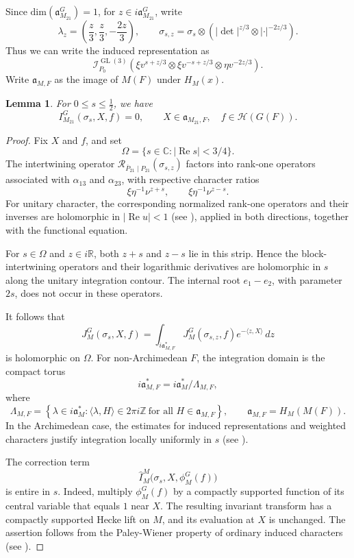\documentclass[11pt]{amsart}
\newtheorem {lemma}      [theorem]    {Lemma}
\renewcommand{\rm}{\mathrm}
\theoremstyle{definition}
\numberwithin{equation}{section}
\begin{document}
	
	Since \(\rm{dim}(\mathfrak{a}_{M_{21}}^G)=1\), for \(z\in i\mathfrak{a}_{M_{21}}^G\), write \[\lambda_z=
\left(\frac z3,\frac z3,-\frac{2z}3\right),\qquad
	\sigma_{s,z} = \sigma_s \otimes \left( | \det |^{z/3} \otimes | \cdot |^{-2z/3} \right).
	\]Thus we can write the induced representation as 
	\[
    \mathscr{I}_{P_0}^{\operatorname{GL}(3)} \left( \xi v^{s+z/3} \otimes \xi v^{-s+z/3} \otimes \eta v^{-2z/3} \right).
	\]
    Write \(\mathfrak a_{M,F}\) as the image of \(M(F)\) under \(H_M(x)\).
    \begin{lemma}\label{lem:standard-vanishing-M21}
For \(0\le s\le\frac12\), we have
\[
I_{M_{21}}^G(\sigma_s,X,f)=0,
\qquad
X\in\mathfrak a_{M_{21},F},
\quad f\in\mathcal H(G(F)).
\]
\end{lemma}
\begin{proof}
Fix \(X\) and \(f\), and set
\[
\Omega=\{s\in\mathbb C:|\operatorname{Re}s|<3/4\}.
\]
The intertwining operator \(\mathscr R_{\overline P_{21}\mid P_{21}}(\sigma_{s,z})\)
factors into rank-one operators associated with
\(\alpha_{13}\) and \(\alpha_{23}\), with respective character ratios
\[
\xi\eta^{-1}\nu^{z+s},
\qquad
\xi\eta^{-1}\nu^{z-s}.
\]
For unitary character, the corresponding normalized
rank-one operators and their inverses are holomorphic in
\(|\operatorname{Re}u|<1\) (see
\cite[\S I.10]{MW89}), applied in both
directions, together with the functional equation.

For \(s\in\Omega\) and \(z\in i\mathbb R\), both \(z+s\)
and \(z-s\) lie in this strip. Hence the block-intertwining
operators and their logarithmic derivatives are holomorphic
in \(s\) along the unitary integration contour. The internal
root \(e_1-e_2\), with parameter \(2s\), does not occur in
these operators.

It follows that
\[
J_M^G(\sigma_s,X,f)
=
\int_{i\mathfrak a_{M,F}^*}
J_M^G(\sigma_{s,z},f)
e^{-\langle z,X\rangle}\,dz
\]
is holomorphic on \(\Omega\). For non-Archimedean \(F\), the integration domain is the compact torus
\[
i\mathfrak a_{M,F}^*
=
i\mathfrak a_M^*/\Lambda_{M,F},
\]
where
\[
\Lambda_{M,F}
=
\left\{
\lambda\in i\mathfrak a_M^*:
\langle\lambda,H\rangle\in2\pi i\mathbb Z
\ \text{for all }H\in\mathfrak a_{M,F}
\right\},
\qquad
\mathfrak a_{M,F}=H_M(M(F)).
\] 
In the Archimedean case,
the estimates for induced representations and weighted
characters justify integration locally uniformly in \(s\) (see \cite[\S6 and \S12, (12.7)]{Art89}).

The correction term
\[
\widehat I_M^M
\bigl(\sigma_s,X,\phi_M^G(f)\bigr)
\]
is entire in \(s\). Indeed, multiply \(\phi_M^G(f)\) by
a compactly supported function of its central variable
that equals \(1\) near \(X\). The resulting invariant
transform has a compactly supported Hecke lift on \(M\),
and its evaluation at \(X\) is unchanged.
The assertion follows from the Paley-Wiener property
of ordinary induced characters (see
\cite[\S1]{Art88}).


\end{proof}
\end{document}
